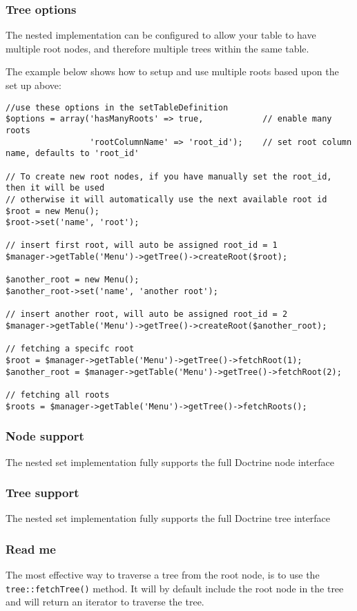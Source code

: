 \documentclass[11pt,a4paper]{report}
\begin{document}
\subsubsection{Tree options}
The nested implementation can be configured to allow your table to have multiple root nodes, and therefore multiple trees within the same table.

The example below shows how to setup and use multiple roots based upon the set up above:

\begin{verbatim}
//use these options in the setTableDefinition
$options = array('hasManyRoots' => true,            // enable many roots
                 'rootColumnName' => 'root_id');    // set root column name, defaults to 'root_id'

// To create new root nodes, if you have manually set the root_id, then it will be used
// otherwise it will automatically use the next available root id
$root = new Menu();
$root->set('name', 'root');

// insert first root, will auto be assigned root_id = 1
$manager->getTable('Menu')->getTree()->createRoot($root);

$another_root = new Menu();
$another_root->set('name', 'another root');

// insert another root, will auto be assigned root_id = 2
$manager->getTable('Menu')->getTree()->createRoot($another_root);

// fetching a specifc root
$root = $manager->getTable('Menu')->getTree()->fetchRoot(1);
$another_root = $manager->getTable('Menu')->getTree()->fetchRoot(2);

// fetching all roots
$roots = $manager->getTable('Menu')->getTree()->fetchRoots();
\end{verbatim}

\subsubsection{Node support}
The nested set implementation fully supports the full Doctrine node interface

\subsubsection{Tree support}
The nested set implementation fully supports the full Doctrine tree interface

\subsubsection{Read me}
The most effective way to traverse a tree from the root node, is to use the \texttt{tree::fetchTree()} method. It will by default include the root node in the tree and will return an iterator to traverse the tree.
\end{document}
